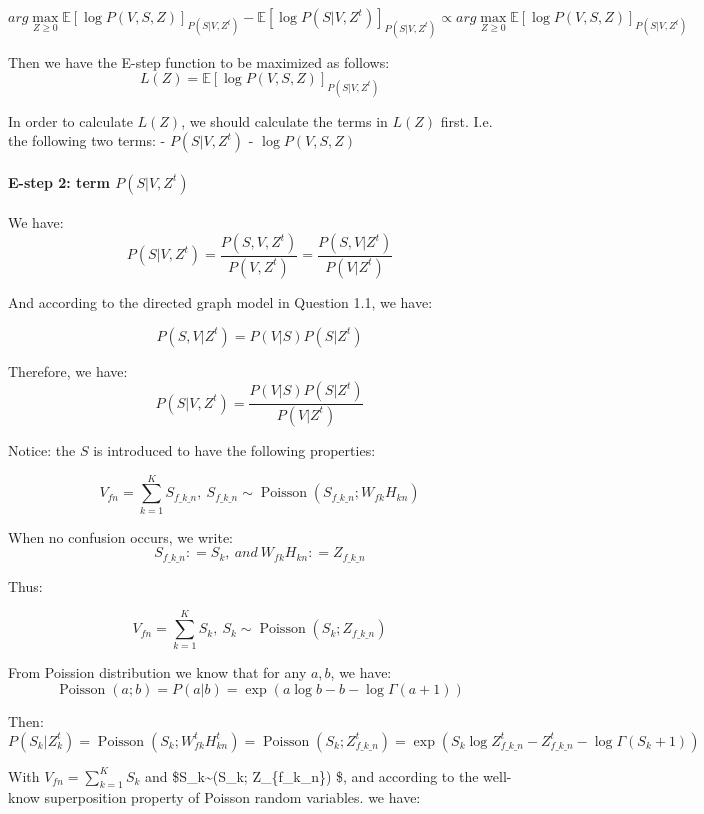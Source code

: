 \documentclass[11pt]{article}
\begin{document}
    \[
arg \max_{Z \geq 0} \mathbb{E} [\log P(V, S, Z)]_{P(S| V, Z^{t})} - \mathbb{E} [\log P(S|V, Z^{t})]_{P(S|V, Z^{t})}  \propto arg \max_{Z \geq 0} \mathbb{E} [\log P(V, S, Z)]_{P(S|V, Z^{t})}
\]

Then we have the E-step function to be maximized as follows:
\[L(Z) = \mathbb{E} [\log P(V, S, Z)]_{P(S|V, Z^{t})}\]

    In order to calculate \(L(Z)\), we should calculate the terms in
\(L(Z)\) first. I.e. the following two terms: - \(P(S|V, Z^{t})\) -
\(\log P(V, S, Z)\)

\paragraph{\texorpdfstring{E-step 2: term
\(P(S|V, Z^{t})\)}{E-step 2: term P(S\textbar{}V, Z\^{}\{t\})}}\label{e-step-2-term-psv-zt}

We have:
\[P(S|V, Z^{t}) = \frac{P(S, V, Z^{t})}{P(V, Z^{t})} = \frac{P(S, V|Z^{t})}{P(V|Z^{t})}\]

And according to the directed graph model in Question 1.1, we have:

\[P(S, V|Z^{t}) = P(V|S)P(S|Z^{t})\]

Therefore, we have:
\[P(S|V, Z^{t}) = \frac{P(V|S)P(S|Z^{t})}{P(V|Z^{t})}\]

Notice: the \(S\) is introduced to have the following properties:

\[V_{fn} = \sum_{k = 1}^{K} S_{f\_k\_n}, \  S_{f\_k\_n} \sim \operatorname{Poisson}(S_{f\_k\_n}; W_{fk} H_{kn}) \]

When no confusion occurs, we write:
\[S_{f\_k\_n}: = S_k, \ and \  W_{fk} H_{kn}: = Z_{f\_k\_n}\]

    Thus:

\[V_{fn} = \sum_{k = 1}^{K} S_k, \  S_k\sim \operatorname{Poisson}(S_k; Z_{f\_k\_n}) \]

From Poission distribution we know that for any \(a, b\), we have:
\[\operatorname{Poisson}(a; b) = P(a|b) = \exp (a \log b - b - \log \Gamma (a + 1)) \]

Then:
\[P(S_k|Z_k^{t}) = \operatorname{Poisson}(S_k; W_{fk}^tH_{kn}^t) = \operatorname{Poisson}(S_k; Z_{f\_k\_n}^t) = \exp (S_k \log Z_{f\_k\_n}^t - Z_{f\_k\_n}^t - \log \Gamma (S_k + 1))  \]

With \(V_{fn} = \sum_{k = 1}^{K} S_k\) and
\$S\_k\sim {}(S\_k; Z\_\{f\_k\_n\}) \$, and
according to the well-know superposition property of Poisson random
variables. we have:
\end{document}
